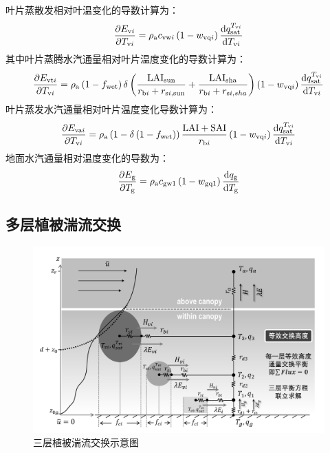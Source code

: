 %
叶片蒸散发相对叶温变化的导数计算为：
\begin{equation}
  \frac{\partial E_{\mathrm{v}i}}{\partial T_{\mathrm{v}i}} = \rho_{\mathrm{a}}c_{\mathrm{vw}i}\left( 1 - w_{\mathrm{vq}i} \right)\frac{{\rm d}q_{\mathrm{sat}}^{T_{\mathrm{v}i}}}{{\rm d}T_{\mathrm{v}i}}
\end{equation}
%
其中叶片蒸腾水汽通量相对叶片温度变化的导数计算为：
\begin{equation}
  \frac{\partial E_{\mathrm{vt}i}}{\partial T_{\mathrm{v}i}} = \rho_{\mathrm{a}}\left( 1 - f_{\mathrm{wet}} \right)\delta\left( \frac{\text{LAI}_{\mathrm{sun}}}{r_{\mathrm{b}i} + r_{\mathrm{s}i,\mathrm{sun}}} + \frac{\text{LAI}_{\mathrm{sha}}}{r_{\mathrm{b}i} + r_{\mathrm{s}i,sha}} \right)\left( 1 - w_{\mathrm{vq}i} \right)\frac{{\rm d}q_{\mathrm{sat}}^{T_{\mathrm{v}i}}}{{\rm d}T_{\mathrm{v}i}}
\end{equation}
%
叶片蒸发水汽通量相对叶片温度变化导数计算为：
\begin{equation}
  \frac{\partial E_{\mathrm{va}i}}{\partial T_{\mathrm{v}i}} = \rho_{\mathrm{a}}\left( 1 - \delta\left( 1 - f_{\mathrm{wet}} \right) \right)\frac{\text{LAI} + \text{SAI}}{r_{\mathrm{b}i}}\left( 1 - w_{\mathrm{vq}i} \right)\frac{{\rm d}q_{\mathrm{sat}}^{T_{\mathrm{v}i}}}{{\rm d}T_{\mathrm{v}i}}
\end{equation}
%
地面水汽通量相对温度变化的导数为：
\begin{equation}
  \frac{\partial E_{\mathrm{g}}}{\partial T_{\mathrm{g}}} = \rho_{\mathrm{a}}c_{\mathrm{gw1}}\left( 1 - w_{\mathrm{gq1}} \right)\frac{{\rm d}q_{\mathrm{g}}}{{\rm d}T_{\mathrm{g}}}
\end{equation}


\subsection{多层植被湍流交换}\label{多层植被湍流交换}
{
  \begin{figure}[htbp]
    \centering
    \includegraphics[width=1\linewidth]{Figures/地表湍流交换过程/三层植被湍流交换示意图_v3.jpg}
    \caption{三层植被湍流交换示意图}
    \label{fig:三层植被湍流交换示意图}
  \end{figure}
}

